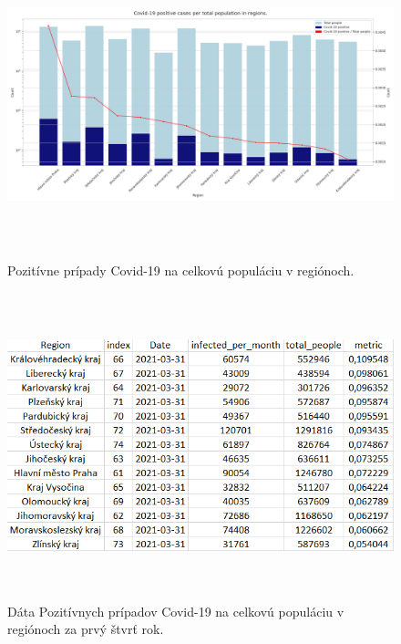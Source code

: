 \documentclass[a4paper, 16pt]{article}
\begin{document}
\begin{figure}[H] \centering
    \includegraphics[width=\linewidth,height=3.5in]{QB.png}
    \caption{Pozitívne prípady Covid-19 na celkovú populáciu v regiónoch.}
    \label{graf_3}
\end{figure}

\begin{figure}[H] \centering
    \includegraphics[width=\linewidth,height=3.5in]{B_0.png}
    \caption{Dáta Pozitívnych prípadov Covid-19 na celkovú populáciu v regiónoch za prvý štvrť rok.}
    \label{table_0}
\end{figure}
\end{document}
